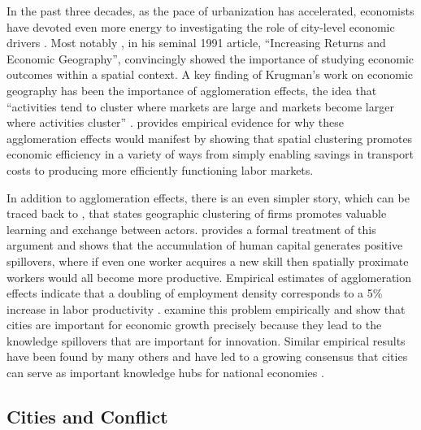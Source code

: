 In the past three decades, as the pace of urbanization has accelerated, economists have devoted even more energy to investigating the role of city-level economic drivers \citep{lucas:1988, ciccone:hall:1996, begg:1999, henderson:wang:2007}. Most notably \citeauthor{krugman:1991a}, in his seminal 1991 article, ``Increasing Returns and Economic Geography'', convincingly showed the importance of studying economic outcomes within a spatial context. A key finding of Krugman's work on economic geography has been the importance of agglomeration effects, the idea that ``activities tend to cluster where markets are large and markets become larger where activities cluster'' \citep{krugman:1997}. \citet{henderson:2000} provides empirical evidence for why these agglomeration effects would manifest by showing that spatial clustering promotes economic efficiency in a variety of ways from simply enabling savings in transport costs to producing more efficiently functioning labor markets.

In addition to agglomeration effects, there is an even simpler story, which can be traced back to \citet{marshall:1920}, that states geographic clustering of firms promotes valuable learning and exchange between actors. \citet{lucas:1988} provides a formal treatment of this argument and shows that the accumulation of human capital generates positive spillovers, where if even one worker acquires a new skill then spatially proximate workers would all become more productive. Empirical estimates of agglomeration effects indicate that a doubling of employment density corresponds to a 5\% increase in labor productivity \citep{ciccone:hall:1996,ciccone:2002}. \citet{glaeser:etal:1992} examine this problem empirically and show that cities are important for economic growth precisely because they lead to the knowledge spillovers that are important for innovation. Similar empirical results have been found by many others and have led to a growing consensus that cities can serve as important knowledge hubs for national economies \citep{jaffe:etal:1993, glaeser:1994, firestone:2010}. 


\subsection{Cities and Conflict}

